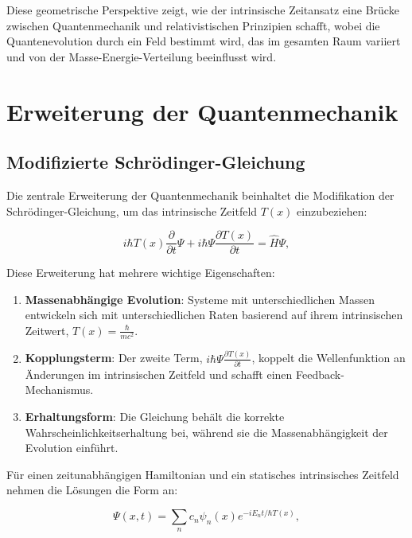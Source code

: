 \documentclass[12pt,a4paper]{article}
\newcommand{\Tfield}{T(x)}
\begin{document}
	Diese geometrische Perspektive zeigt, wie der intrinsische Zeitansatz eine Brücke zwischen Quantenmechanik und relativistischen Prinzipien schafft, wobei die Quantenevolution durch ein Feld bestimmt wird, das im gesamten Raum variiert und von der Masse-Energie-Verteilung beeinflusst wird.
	
	\section{Erweiterung der Quantenmechanik}
	\label{sec:qm_extension}
	
	\subsection{Modifizierte Schrödinger-Gleichung}
	\label{subsec:modified_schrodinger}
	
	Die zentrale Erweiterung der Quantenmechanik beinhaltet die Modifikation der Schrödinger-Gleichung, um das intrinsische Zeitfeld $\Tfield$ einzubeziehen:
	
	\begin{equation}
		i\hbar \Tfield \frac{\partial}{\partial t} \Psi + i\hbar \Psi \frac{\partial \Tfield}{\partial t} = \hat{H} \Psi,
		\label{eq:modified_schrodinger}
	\end{equation}
	
	Diese Erweiterung hat mehrere wichtige Eigenschaften:
	
	\begin{enumerate}
		\item \textbf{Massenabhängige Evolution}: Systeme mit unterschiedlichen Massen entwickeln sich mit unterschiedlichen Raten basierend auf ihrem intrinsischen Zeitwert, $\Tfield = \frac{\hbar}{mc^2}$.
		
		\item \textbf{Kopplungsterm}: Der zweite Term, $i\hbar \Psi \frac{\partial \Tfield}{\partial t}$, koppelt die Wellenfunktion an Änderungen im intrinsischen Zeitfeld und schafft einen Feedback-Mechanismus.
		
		\item \textbf{Erhaltungsform}: Die Gleichung behält die korrekte Wahrscheinlichkeitserhaltung bei, während sie die Massenabhängigkeit der Evolution einführt.
	\end{enumerate}
	
	Für einen zeitunabhängigen Hamiltonian und ein statisches intrinsisches Zeitfeld nehmen die Lösungen die Form an:
	
	\begin{equation}
		\Psi(x,t) = \sum_n c_n \psi_n(x) e^{-iE_n t / \hbar \Tfield},
		\label{eq:modified_solution}
	\end{equation}
	
\end{document}
